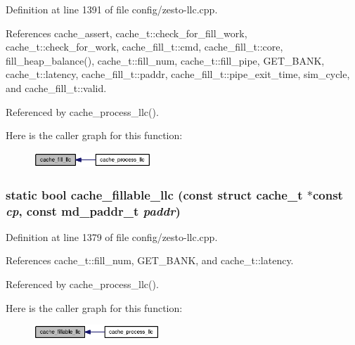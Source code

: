 Definition at line 1391 of file config/zesto-llc.cpp.

References cache\_\-assert, cache\_\-t::check\_\-for\_\-fill\_\-work, cache\_\-t::check\_\-for\_\-work, cache\_\-fill\_\-t::cmd, cache\_\-fill\_\-t::core, fill\_\-heap\_\-balance(), cache\_\-t::fill\_\-num, cache\_\-t::fill\_\-pipe, GET\_\-BANK, cache\_\-t::latency, cache\_\-fill\_\-t::paddr, cache\_\-fill\_\-t::pipe\_\-exit\_\-time, sim\_\-cycle, and cache\_\-fill\_\-t::valid.

Referenced by cache\_\-process\_\-llc().

Here is the caller graph for this function:\nopagebreak
\begin{figure}[H]
\begin{center}
\leavevmode
\includegraphics[width=125pt]{config_2zesto-llc_8cpp_acfad7c90ec1f20c91ccfcae11d67dea_icgraph}
\end{center}
\end{figure}
\subsubsection[{cache\_\-fillable\_\-llc}]{\setlength{\rightskip}{0pt plus 5cm}static bool cache\_\-fillable\_\-llc (const struct {\bf cache\_\-t} $\ast$const  {\em cp}, \/  const {\bf md\_\-paddr\_\-t} {\em paddr})\hspace{0.3cm}{\tt  [inline, static]}}\label{config_2zesto-llc_8cpp_9c38467a1f69e44fd7487395ba6ff279}




Definition at line 1379 of file config/zesto-llc.cpp.

References cache\_\-t::fill\_\-num, GET\_\-BANK, and cache\_\-t::latency.

Referenced by cache\_\-process\_\-llc().

Here is the caller graph for this function:\nopagebreak
\begin{figure}[H]
\begin{center}
\leavevmode
\includegraphics[width=134pt]{config_2zesto-llc_8cpp_9c38467a1f69e44fd7487395ba6ff279_icgraph}
\end{center}
\end{figure}
